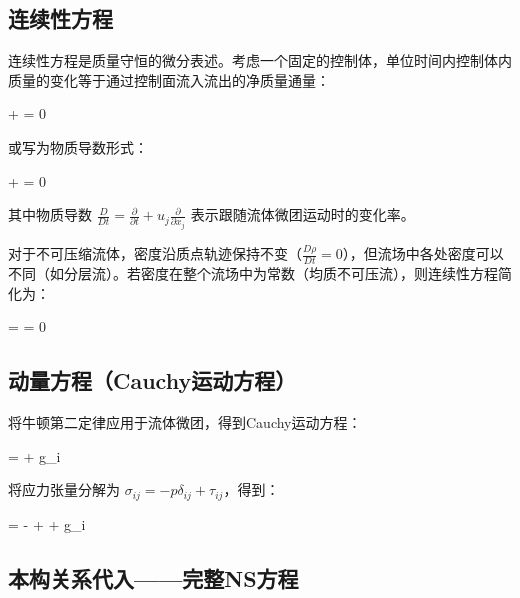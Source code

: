 \subsection{连续性方程}

连续性方程是质量守恒的微分表述。考虑一个固定的控制体，单位时间内控制体内质量的变化等于通过控制面流入流出的净质量通量：

\begin{myformula}
     +  = 0
\end{myformula}

或写为物质导数形式：

\begin{myformula}
     + \rho{} = 0
\end{myformula}

其中物质导数 $\frac{D}{Dt} = \frac{\partial}{\partial t} + u_j\frac{\partial}{\partial x_j}$ 表示跟随流体微团运动时的变化率。

对于不可压缩流体，密度沿质点轨迹保持不变（$\frac{D\rho}{Dt}=0$），但流场中各处密度可以不同（如分层流）。若密度在整个流场中为常数（均质不可压流），则连续性方程简化为：

\begin{myformula}
     = \nabla\cdot{} = 0
\end{myformula}

\subsection{动量方程（Cauchy运动方程）}

将牛顿第二定律应用于流体微团，得到Cauchy运动方程：

\begin{myformula}
    \rho{} =  + \rho g_i
\end{myformula}

将应力张量分解为 $\sigma_{ij} = -p\delta_{ij} + \tau_{ij}$，得到：

\begin{myformula}
    \rho{} = - +  + \rho g_i
\end{myformula}

\subsection{本构关系代入——完整NS方程}

